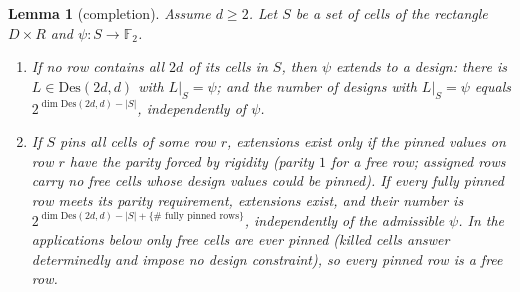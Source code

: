 \documentclass[11pt]{article}
\newtheorem{lemma}[theorem]{Lemma}
\theoremstyle{definition}
\theoremstyle{remark}
\newcommand{\F}{\mathbb{F}}
\newcommand{\Des}{\mathrm{Des}}
\begin{document}
\begin{lemma}[completion]\label{lem:completion}
Assume $d\ge2$.  Let $S$ be a set of cells of the rectangle $D\times R$
and $\psi:S\to\F_2$.
\begin{enumerate}
\item[(a)] If no row contains all $2d$ of its cells in $S$, then $\psi$
extends to a design: there is $L\in\Des(2d,d)$ with $L|_S=\psi$; and the
number of designs with $L|_S=\psi$ equals $2^{\dim\Des(2d,d)-|S|}$,
independently of $\psi$.
\item[(b)] If $S$ pins all cells of some row $r$, extensions exist only
if the pinned values on row $r$ have the parity forced by rigidity
(parity $1$ for a free row; assigned rows carry no free cells whose
design values could be pinned).  If every fully pinned row meets its
parity requirement,
extensions exist, and their number is
$2^{\dim\Des(2d,d)-|S|+\{\#\text{ fully pinned rows}\}}$,
independently of the admissible $\psi$.  In the applications below only
free cells are ever pinned (killed cells answer determinedly and impose
no design constraint), so every pinned row is a free row.
\end{enumerate}
\end{lemma}
\end{document}
